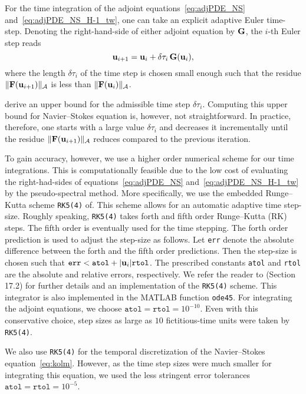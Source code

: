 \documentclass{jfm}
\begin{document}
For the time integration of the adjoint equations~\eqref{eq:adjPDE_NS}
and~\eqref{eq:adjPDE_NS_H-1_tw},
one can take an explicit adaptive Euler time-step. Denoting the right-hand-side of either adjoint
equation by $\mathbf G$, the $i$-th Euler step reads
$$\mathbf u_{i+1}=\mathbf u_i+\delta\tau_i\,\mathbf G(\mathbf u_i),$$
where the length $\delta\tau_i$ of the time step is chosen small enough such that the residue
$\|\mathbf F(\mathbf u_{i+1})\|_{\mathcal A}$ is less than $\|\mathbf F(\mathbf u_{i})\|_{\mathcal A}$.

\cite{yang07} derive an upper bound for the admissible time step $\delta\tau_i$.
Computing this upper bound for Navier--Stokes equation is, however, not straightforward.
In practice, therefore, one starts with a large value $\delta\tau_i$ and decreases it incrementally
until the residue $\|\mathbf F(\mathbf u_{i+1})\|_{\mathcal A}$ reduces compared to the previous iteration.

To gain accuracy, however, we use a higher order numerical scheme for our time integrations.
This is computationally feasible due to
the low
cost of evaluating the right-had-sides of equations~\eqref{eq:adjPDE_NS}
and~\eqref{eq:adjPDE_NS_H-1_tw} by the pseudo-spectral method.
%
More specifically, we use the
embedded Runge--Kutta scheme \texttt{RK5(4)} of. This scheme allows for an automatic adaptive time step-size. Roughly speaking,
\texttt{RK5(4)} takes forth and fifth order Runge--Kutta (RK) steps. The fifth order is eventually
used for the time stepping. The forth order prediction is used to adjust the step-size as follows.
Let \texttt{err} denote the absolute difference between the forth and the fifth order predictions.
Then the step-size is chosen such that $\texttt{err}<\texttt{atol}+|\mathbf u_i|\texttt{rtol}$.
The prescribed constants \texttt{atol} and \texttt{rtol} are the absolute and relative errors,
respectively. We refer the reader to (Section 17.2) for further details and an
implementation of the
\texttt{RK5(4)} scheme. This integrator is also implemented in the MATLAB function
\texttt{ode45}.
For integrating the adjoint equations, we choose $\texttt{atol}=\texttt{rtol}=10^{-10}$.
Even with this conservative choice, step sizes as large as $10$ fictitious-time units were
taken by \texttt{RK5(4)}.

We also use \texttt{RK5(4)} for the temporal discretization of the Navier--Stokes
equation~\eqref{eq:kolm}. However, as the time step sizes were much smaller for integrating
this equation, we used the less stringent error tolerances $\texttt{atol}=\texttt{rtol}=10^{-5}$.
\end{document}
